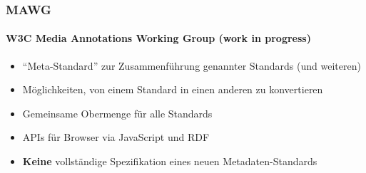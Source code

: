 \documentclass[14pt]{beamer}
\begin{document}
\begin{frame}
	\frametitle{MAWG}
	\framesubtitle{W3C Media Annotations Working Group (work in progress)}
	\begin{itemize}
		\pause \item \enquote{Meta-Standard} zur Zusammenführung genannter Standards (und weiteren)
		\pause \item Möglichkeiten, von einem Standard in einen anderen zu konvertieren
		\pause \item Gemeinsame Obermenge für alle Standards
		\pause \item APIs für Browser via JavaScript und RDF
		\pause \item \textbf{Keine} vollständige Spezifikation eines neuen Metadaten-Standards
	\end{itemize}
\end{frame}
\end{document}
